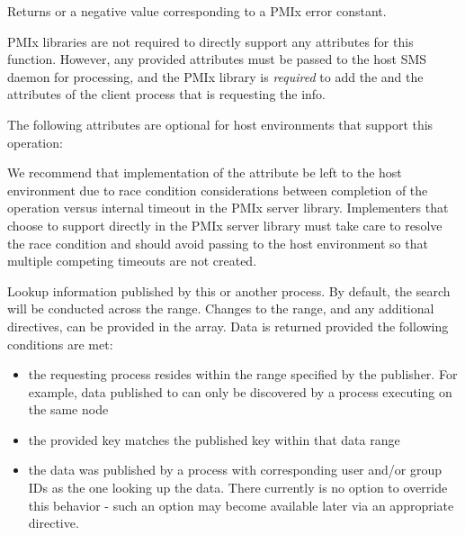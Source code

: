 Returns  or a negative value corresponding to a PMIx error constant.

\reqattrstart
\ac{PMIx} libraries are not required to directly support any attributes for this function. However, any provided attributes must be passed to the host \ac{SMS} daemon for processing, and the \ac{PMIx} library is \textit{required} to add the  and the  attributes of the client process that is requesting the info.

\reqattrend

\optattrstart
The following attributes are optional for host environments that support this operation:


\optattrend

\adviceimplstart
We recommend that implementation of the  attribute be left to the host environment due to race condition considerations between completion of the operation versus internal timeout in the \ac{PMIx} server library. Implementers that choose to support  directly in the \ac{PMIx} server library must take care to resolve the race condition and should avoid passing  to the host environment so that multiple competing timeouts are not created.
\adviceimplend

\descr

Lookup information published by this or another process.
By default, the search will be conducted across the  range.
Changes to the range, and any additional directives, can be provided in the  array. Data is returned provided the following conditions are met:

\begin{itemize}
    \item the requesting process resides within the range specified by the publisher. For example, data published to  can only be discovered by a process executing on the same node
    \item the provided key matches the published key within that data range
    \item the data was published by a process with corresponding user and/or group IDs as the one looking up the data. There currently is no option to override this behavior - such an option may become available later via an appropriate  directive.
\end{itemize}

